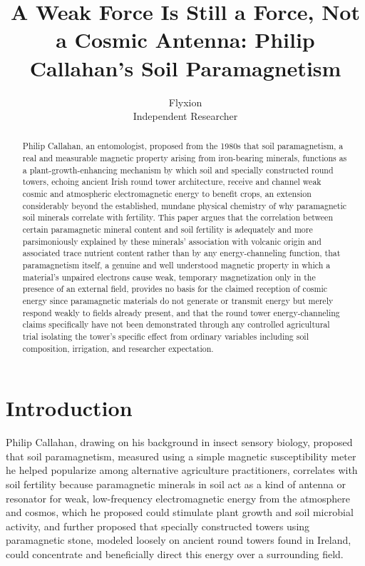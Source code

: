 \documentclass[11pt]{article}
\title{A Weak Force Is Still a Force, Not a Cosmic Antenna: Philip Callahan's Soil Paramagnetism}
\author{Flyxion \\ \small Independent Researcher}
\date{}
\begin{document}
\maketitle

\begin{abstract}
Philip Callahan, an entomologist, proposed from the 1980s that soil paramagnetism, a real and measurable magnetic property arising from iron-bearing minerals, functions as a plant-growth-enhancing mechanism by which soil and specially constructed round towers, echoing ancient Irish round tower architecture, receive and channel weak cosmic and atmospheric electromagnetic energy to benefit crops, an extension considerably beyond the established, mundane physical chemistry of why paramagnetic soil minerals correlate with fertility. This paper argues that the correlation between certain paramagnetic mineral content and soil fertility is adequately and more parsimoniously explained by these minerals' association with volcanic origin and associated trace nutrient content rather than by any energy-channeling function, that paramagnetism itself, a genuine and well understood magnetic property in which a material's unpaired electrons cause weak, temporary magnetization only in the presence of an external field, provides no basis for the claimed reception of cosmic energy since paramagnetic materials do not generate or transmit energy but merely respond weakly to fields already present, and that the round tower energy-channeling claims specifically have not been demonstrated through any controlled agricultural trial isolating the tower's specific effect from ordinary variables including soil composition, irrigation, and researcher expectation.
\end{abstract}

\section{Introduction}

Philip Callahan, drawing on his background in insect sensory biology, proposed that soil paramagnetism, measured using a simple magnetic susceptibility meter he helped popularize among alternative agriculture practitioners, correlates with soil fertility because paramagnetic minerals in soil act as a kind of antenna or resonator for weak, low-frequency electromagnetic energy from the atmosphere and cosmos, which he proposed could stimulate plant growth and soil microbial activity, and further proposed that specially constructed towers using paramagnetic stone, modeled loosely on ancient round towers found in Ireland, could concentrate and beneficially direct this energy over a surrounding field.
\end{document}
